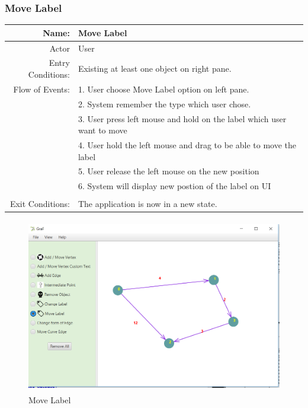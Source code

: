 \documentclass[a4paper,10pt]{article}
\begin{document}
\subsubsection{Move Label}
	\begin{tabular}{|r|l|}
\hline
Name: & Move Label \\
\hline
Actor & User \\
\hline
Entry Conditions: & Existing at least one object on right pane. \\
\hline
Flow of Events: & 1. User choose Move Label option on left pane. \\
& 2. System remember the type which user chose.  \\
& 3. User press left mouse and hold on the label which user want to move \\
& 4. User hold the left mouse and drag to be able to move the label\\
& 5. User release the left mouse on the new position\\
& 6. System will display new postion of the label on UI \\
\\
\hline
Exit Conditions: & The application is now in a new state. \\
\hline

\end{tabular}
\begin{figure}[H]
		\centering
		\includegraphics[height = 3in]{moveLabel.png}
		\caption[Optional caption]{Move Label}
		\label{fig:Repository}
	\end{figure}
\paragraph{}
\end{document}
